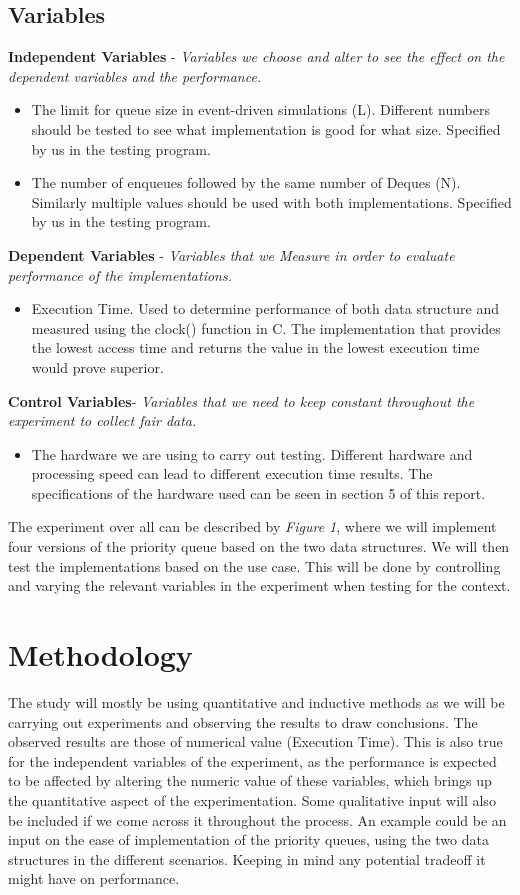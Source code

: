 \documentclass[12pt]{article}
\begin{document}
\subsection{Variables} 
\textbf{Independent Variables}  - \textit{Variables we choose and alter to see the effect on the dependent variables and the performance.}
\begin{itemize}
 \item The limit for queue size in event-driven simulations (L). Different numbers should be tested to see what implementation is good for what size. Specified by us in the testing program.
\item The number of enqueues followed by the same number of Deques (N). Similarly multiple values should be used with both implementations. Specified by us in the testing program.
\end{itemize}
\textbf{Dependent Variables} - \textit{Variables that we Measure in order to evaluate performance of the implementations.}
\begin{itemize}
\item Execution Time. Used to determine performance of both data structure and measured using the clock() function in C. The implementation that provides the lowest access time and returns the value in the lowest execution time would prove superior.
\end{itemize}
\textbf{Control Variables}- \textit{Variables that we need to keep constant throughout the experiment to collect fair data.}
\begin{itemize}
\item The hardware we are using to carry out testing. Different hardware and processing speed can lead to different execution time results. The specifications of the hardware used can be seen in section 5 of this report. 
\end{itemize}
The experiment over all can be described by \textit{Figure 1}, where we will implement four versions of the priority queue based on the two data structures. We will then test the implementations based on the use case. This will be done by controlling and varying the relevant variables in the experiment when testing for the context. 

\section{Methodology}

 The study will mostly be using quantitative and inductive methods as we will be carrying out experiments and observing the results to draw conclusions. The observed results are those of numerical value (Execution Time). This is also true for the independent variables of the experiment, as the performance is expected to be affected by altering the numeric value of these variables, which brings up the quantitative aspect of the experimentation. Some qualitative input will also be included if we come across it throughout the process. An example could be an input on the ease of implementation of the priority queues, using the two data structures in the different scenarios. Keeping in mind any potential tradeoff it might have on performance. 
 
\end{document}
